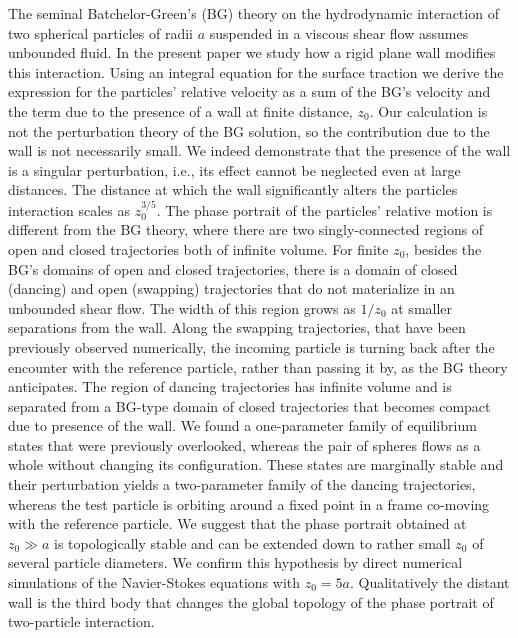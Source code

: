 \begin{paper}

\makepapertitle

%
\begin{paperabstract}
	
The seminal Batchelor-Green's (BG) theory on the hydrodynamic interaction of two spherical particles of radii $a$ suspended in a viscous shear flow assumes unbounded fluid. In the present paper we study how a rigid plane wall modifies this interaction. Using an integral equation for the surface traction we derive the expression for the particles' relative velocity as a sum of the BG's velocity and the term due to the presence of a wall at finite distance, $z_0$. Our calculation is not the perturbation theory of the BG solution, so the contribution due to the wall is not necessarily small. We indeed demonstrate that the presence of the wall is a singular perturbation, i.e., its effect cannot be neglected even at large distances. The distance at which the wall significantly alters the particles interaction scales as $z_0^{3/5}$. The phase portrait of the particles' relative motion is different from the BG theory, where there are two singly-connected regions of open and closed trajectories both of infinite volume. For finite $z_0$, besides the BG's domains of open and closed trajectories, there is a domain of closed (dancing) and open (swapping) trajectories that do not materialize in an unbounded shear flow. The width of this region grows as $1/z_0$ at smaller separations from the wall. Along the swapping trajectories, that have been previously observed numerically, the incoming particle is turning back after the encounter with the reference particle, rather than passing it by, as the BG theory anticipates. The region of dancing trajectories has infinite volume and is separated from a BG-type domain of closed trajectories that becomes compact due to presence of the wall. We found a one-parameter family of equilibrium states that were previously overlooked, whereas the pair of spheres flows as a whole without changing its configuration. These states are marginally stable and their perturbation yields a two-parameter family of the dancing trajectories, whereas the test particle is orbiting around a fixed point in a frame co-moving with the reference particle. We suggest that the phase portrait obtained at $z_0 \gg a$ is topologically stable and can be extended down to rather small $z_0$ of several particle diameters. We confirm this hypothesis by direct numerical simulations of the Navier-Stokes equations with $z_0=5a$. Qualitatively the distant wall is the third body that changes the global topology of the phase portrait of two-particle interaction.
\end{paperabstract}



\end{paper}
